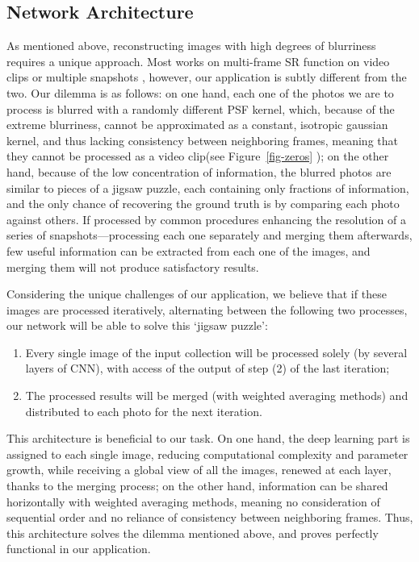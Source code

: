\subsection{Network Architecture} 
 As mentioned above, reconstructing images with high degrees of blurriness requires a unique approach. Most works on multi-frame SR function on video clips \cite{lucas2019generative} or multiple snapshots \cite{wronski2019handheld}, however, our application is subtly different from the two. Our dilemma is as follows: on one hand, each one of the photos we are to process is blurred with a randomly different PSF kernel, which, because of the extreme blurriness, cannot be approximated as a constant, isotropic gaussian kernel, and thus lacking consistency between neighboring frames, meaning that they cannot be processed as a video clip(see Figure~\ref{fig-zeros} ); on the other hand, because of the low concentration of information, the blurred photos are similar to pieces of a jigsaw puzzle, each containing only fractions of information, and the only chance of recovering the ground truth is by comparing each photo against others. If processed by common procedures enhancing the resolution of a series of snapshots—processing each one separately and merging them afterwards, few useful information can be extracted from each one of the images, and merging them will not produce satisfactory results.

Considering the unique challenges of our application, we believe that if these images are processed iteratively, alternating between the following two processes, our network will be able to solve this ‘jigsaw puzzle’:

\begin{enumerate}
  \item Every single image of the input collection will be processed solely (by several layers of CNN), with access of the output of step (2) of the last iteration;
  \item The processed results will be merged (with weighted averaging methods) and distributed to each photo for the next iteration.
\end{enumerate}

This architecture is beneficial to our task. On one hand, the deep learning part is assigned to each single image, reducing computational complexity and parameter growth, while receiving a global view of all the images, renewed at each layer, thanks to the merging process; on the other hand, information can be shared horizontally with weighted averaging methods, meaning no consideration of sequential order and no reliance of consistency between neighboring frames. Thus, this architecture solves the dilemma mentioned above, and proves perfectly functional in our application.


